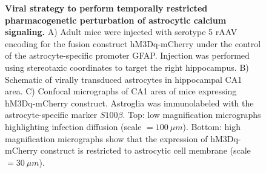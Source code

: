 \begin{figure}[h]
    \caption[Viral strategy to perform temporally restricted pharmacogenetic perturbation of astrocytic calcium signaling.]{\textbf{Viral strategy to perform temporally restricted pharmacogenetic perturbation of astrocytic calcium signaling.} 
    A) Adult mice were injected with serotype 5 rAAV encoding for the fusion construct hM3Dq-mCherry under the control of the astrocyte-specific promoter GFAP. 
    Injection was performed using stereotaxic coordinates to target the right hippocampus. 
    B) Schematic of virally transduced astrocytes in hippocampal CA1 area. 
    C) Confocal micrographs of CA1 area of mice expressing hM3Dq-mCherry construct. Astroglia was immunolabeled with the astrocyte-specific marker $S100\beta$. 
    Top: low magnification micrographs highlighting infection diffusion (scale $= 100\ \mu m$). 
    Bottom: high magnification micrographs show that the expression of hM3Dq-mCherry construct is restricted to astrocytic cell membrane (scale $= 30\ \mu m$).}
    \label{fig:chap4:mcherry_dq_expression}
\end{figure}

